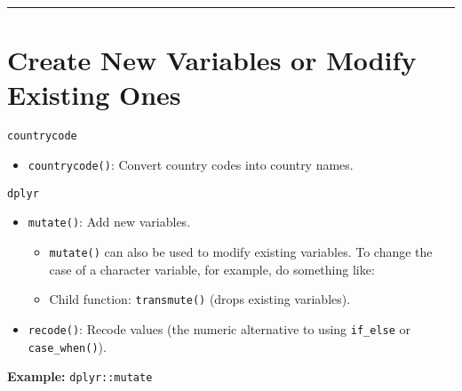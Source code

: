 \documentclass[
]{book}
\newenvironment{Shaded}{\begin{snugshade}}{\end{snugshade}}
\newcommand{\CommentTok}[1]{\textcolor[rgb]{0.56,0.35,0.01}{\textit{#1}}}
\newcommand{\DataTypeTok}[1]{\textcolor[rgb]{0.13,0.29,0.53}{#1}}
\newcommand{\DecValTok}[1]{\textcolor[rgb]{0.00,0.00,0.81}{#1}}
\newcommand{\KeywordTok}[1]{\textcolor[rgb]{0.13,0.29,0.53}{\textbf{#1}}}
\newcommand{\NormalTok}[1]{#1}
\newcommand{\OperatorTok}[1]{\textcolor[rgb]{0.81,0.36,0.00}{\textbf{#1}}}
\newcommand{\StringTok}[1]{\textcolor[rgb]{0.31,0.60,0.02}{#1}}
\providecommand{\tightlist}{%
  \setlength{\itemsep}{0pt}\setlength{\parskip}{0pt}}
\begin{document}
\begin{center}\rule{0.5\linewidth}{0.5pt}\end{center}

\hypertarget{create-new-variables-or-modify-existing-ones}{%
\section{Create New Variables or Modify Existing Ones}\label{create-new-variables-or-modify-existing-ones}}

\texttt{countrycode}

\begin{itemize}
\tightlist
\item
  \texttt{countrycode()}: Convert country codes into country names.
\end{itemize}

\texttt{dplyr}

\begin{itemize}
\tightlist
\item
  \texttt{mutate()}: Add new variables.

  \begin{itemize}
  \tightlist
  \item
    \texttt{mutate()} can also be used to modify existing variables. To change the case of a character variable, for example, do something like:
  \item
    Child function: \texttt{transmute()} (drops existing variables).
  \end{itemize}
\item
  \texttt{recode()}: Recode values (the numeric alternative to using \texttt{if\_else} or \texttt{case\_when()}).
\end{itemize}

\textbf{Example:} \texttt{dplyr::mutate}

\begin{Shaded}
\end{Shaded}
\end{document}
